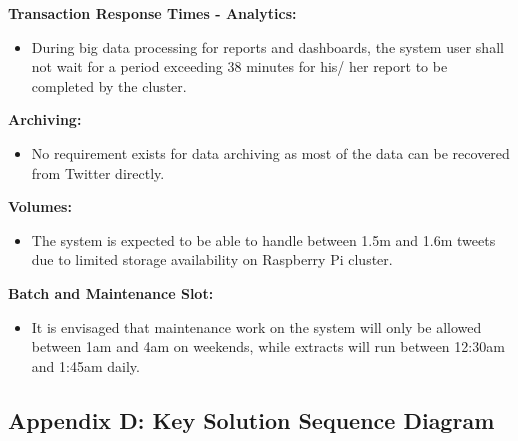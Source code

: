 \documentclass[12pt]{article} %
\begin{document}
		\textbf{Transaction Response Times - Analytics:}
		
		\begin{itemize}
			\item During big data processing for reports and dashboards, the system user shall not wait for a period exceeding 38 minutes for his/ her report to be completed by the cluster.
		\end{itemize}
	
		\textbf{Archiving:}
		
		\begin{itemize}
			\item No requirement exists for data archiving as most of the data can be recovered from Twitter directly.
		\end{itemize}
		
		\textbf{Volumes:}
			
		\begin{itemize}
			\item The system is expected to be able to handle between 1.5m and 1.6m tweets due to limited storage availability on Raspberry Pi cluster.
		\end{itemize}
	
		\textbf{Batch and Maintenance Slot:}
		
		\begin{itemize}
			\item It is envisaged that maintenance work on the system will only be allowed between 1am and 4am on weekends, while extracts will run between 12:30am and 1:45am daily.
		\end{itemize}
	
	\newpage
	
	\subsection{Appendix D: Key Solution Sequence Diagram}
		
\end{document}

